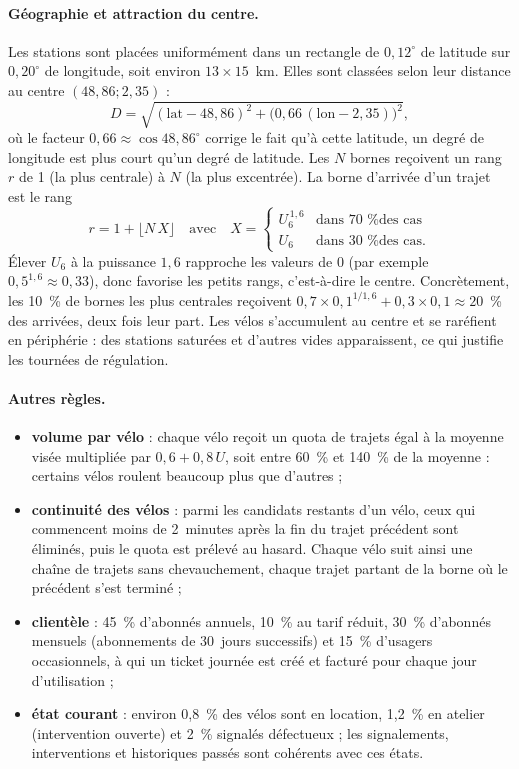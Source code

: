 \paragraph{Géographie et attraction du centre.} Les stations sont placées uniformément dans un rectangle de $0{,}12^\circ$ de latitude sur $0{,}20^\circ$ de longitude, soit environ $13 \times 15$~km. Elles sont classées selon leur distance au centre $(48{,}86 ; 2{,}35)$ :
\[
	D = \sqrt{(\text{lat} - 48{,}86)^2 + \bigl(0{,}66\,(\text{lon} - 2{,}35)\bigr)^2},
\]
où le facteur $0{,}66 \approx \cos 48{,}86^\circ$ corrige le fait qu'à cette latitude, un degré de longitude est plus court qu'un degré de latitude. Les $N$ bornes reçoivent un rang $r$ de 1 (la plus centrale) à $N$ (la plus excentrée). La borne d'arrivée d'un trajet est le rang
\[
	r = 1 + \lfloor N\,X \rfloor \quad\text{avec}\quad
	X = \begin{cases}
		U_6^{\,1{,}6} & \text{dans 70~\% des cas} \\
		U_6 & \text{dans 30~\% des cas.}
	\end{cases}
\]
Élever $U_6$ à la puissance $1{,}6$ rapproche les valeurs de 0 (par exemple $0{,}5^{1{,}6} \approx 0{,}33$), donc favorise les petits rangs, c'est-à-dire le centre. Concrètement, les 10~\% de bornes les plus centrales reçoivent $0{,}7 \times 0{,}1^{1/1{,}6} + 0{,}3 \times 0{,}1 \approx 20$~\% des arrivées, deux fois leur part. Les vélos s'accumulent au centre et se raréfient en périphérie : des stations saturées et d'autres vides apparaissent, ce qui justifie les tournées de régulation.

\paragraph{Autres règles.}
\begin{itemize}
	\item \textbf{volume par vélo} : chaque vélo reçoit un quota de trajets égal à la moyenne visée multipliée par $0{,}6 + 0{,}8\,U$, soit entre 60~\% et 140~\% de la moyenne : certains vélos roulent beaucoup plus que d'autres ;
	\item \textbf{continuité des vélos} : parmi les candidats restants d'un vélo, ceux qui commencent moins de 2~minutes après la fin du trajet précédent sont éliminés, puis le quota est prélevé au hasard. Chaque vélo suit ainsi une chaîne de trajets sans chevauchement, chaque trajet partant de la borne où le précédent s'est terminé ;
	\item \textbf{clientèle} : 45~\% d'abonnés annuels, 10~\% au tarif réduit, 30~\% d'abonnés mensuels (abonnements de 30~jours successifs) et 15~\% d'usagers occasionnels, à qui un ticket journée est créé et facturé pour chaque jour d'utilisation ;
	\item \textbf{état courant} : environ 0,8~\% des vélos sont en location, 1,2~\% en atelier (intervention ouverte) et 2~\% signalés défectueux ; les signalements, interventions et historiques passés sont cohérents avec ces états.
\end{itemize}


